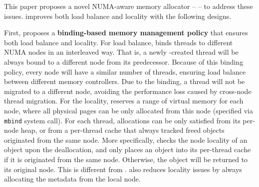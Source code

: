 
This paper proposes a novel NUMA-aware memory allocator -- \NM{} -- to address these  issues. \NM{} improves both load balance and locality with the following designs.  

First, \NM{} proposes a \textbf{binding-based memory management policy} that ensures both load balance and locality. For load balance, \NM{} binds threads to different NUMA nodes in an interleaved way. That is, a newly -created thread will be always bound to a different node from its predecessor. Because of this binding policy, every node will have a similar number of threads, ensuring load balance between different memory controllers. Due to the binding, a thread will not be migrated to a different node, avoiding the performance loss caused by cross-node thread migration. For the locality, \NM{} reserves a range of virtual memory for each node, where all physical pages can be only allocated from this node (specified via \texttt{mbind} system call). For each thread, allocations can be only satisfied from its per-node heap, or from a per-thread cache that always tracked freed objects originated from the same node. More specifically, \NM{} checks the node locality of an object upon the deallocation, and only places an object into its per-thread cache if it is originated from the same node. Otherwise, the object will be returned to its original node. This is different from \TN{}. \NM{} also reduces locality issues by always allocating the metadata from the local node.  


  
